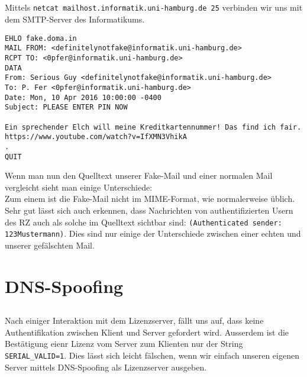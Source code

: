 \documentclass{scrartcl}
\begin{document}
    \subsection{}
    \label{sub:2.1}
      Mittels \texttt{netcat mailhost.informatik.uni-hamburg.de 25} verbinden
      wir uns mit dem SMTP-Server des Informatikums.
      \begin{lstlisting}
EHLO fake.doma.in
MAIL FROM: <definitelynotfake@informatik.uni-hamburg.de>
RCPT TO: <0pfer@informatik.uni-hamburg.de>
DATA
From: Serious Guy <definitelynotfake@informatik.uni-hamburg.de>
To: P. Fer <0pfer@informatik.uni-hamburg.de>
Date: Mon, 10 Apr 2016 10:00:00 -0400
Subject: PLEASE ENTER PIN NOW

Ein sprechender Elch will meine Kreditkartennummer! Das find ich fair.
https://www.youtube.com/watch?v=IfXMN3VhikA
.
QUIT
      \end{lstlisting}
      Wenn man nun den Quelltext unserer Fake-Mail und einer normalen Mail
      vergleicht sieht man einige Unterschiede:\\
      Zum einem ist die Fake-Mail nicht im MIME-Format, wie normalerweise
      üblich. Sehr gut lässt sich auch erkennen, dass Nachrichten von
      authentifizierten Usern des RZ auch als solche im Quelltext sichtbar
      sind: \texttt{(Authenticated sender: 123Mustermann)}. Dies sind nur
      einige der Unterschiede zwischen einer echten und unserer gefälschten
      Mail.

  \section{DNS-Spoofing}
  \label{sec:DNS-Spoofing}
    \subsection{}
    \label{sub:3.1}
      Nach einiger Interaktion mit dem Lizenzserver, fällt uns auf, dass keine
      Authentifikation zwischen Klient und Server gefordert wird. Ausserdem ist
      die Bestätigung eienr Lizenz vom Server zum Klienten nur der String
      \texttt{SERIAL\_VALID=1}. Dies lässt sich leicht fälschen, wenn wir
      einfach unseren eigenen Server mittels DNS-Spoofing als Lizenzserver
      ausgeben.
\end{document}
